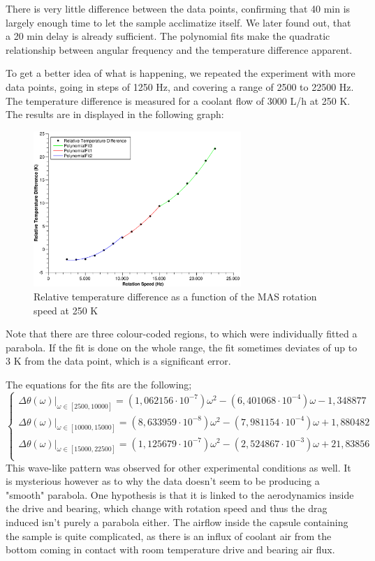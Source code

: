 \documentclass[12pt]{article}
\begin{document}
There is very little difference between the data points, confirming that 40 min is largely enough time to let the sample acclimatize itself. We later found out, that a 20 min delay is already sufficient. The polynomial fits make the quadratic relationship between angular frequency and the temperature difference apparent.

To get a better idea of what is happening, we repeated the experiment with more data points, going in steps of 1250 Hz, and covering a range of 2500 to 22500 Hz. The temperature difference is measured for a coolant flow of 3000 L/h at 250 K. The results are in displayed in the following graph:

\begin{figure}[!ht]
    \centering
    \includegraphics[width=0.7\textwidth]{207Pb/207Pb_250K.pdf}
    \caption{Relative temperature difference as a function of the MAS rotation speed at 250 K}
    \label{fig:207Pb_250K}
\end{figure}
\FloatBarrier

Note that there are three colour-coded regions, to which were individually fitted a parabola. If the fit is done on the whole range, the fit sometimes deviates of up to 3 K from the data point, which is a significant error.

The equations for the fits are the following;
\[
\begin{cases}
    \left. \Delta \theta (\omega) \right|_{\omega \in [2500,10000]} = (1,062156 \cdot 10^{-7}) \omega^2 -(6,401068 \cdot 10^{-4}) \omega - 1,348877 \\ 
    \left. \Delta \theta (\omega) \right|_{\omega \in [10000,15000]} = (8,633959 \cdot 10^{-8}) \omega^2 -(7,981154 \cdot 10^{-4}) \omega + 1,880482 \\ 
    \left. \Delta \theta (\omega) \right|_{\omega \in [15000,22500]} = (1,125679 \cdot 10^{-7}) \omega^2 -(2,524867 \cdot 10^{-3}) \omega + 21,83856 \\ 
\end{cases}
\]  
This wave-like pattern was observed for other experimental conditions as well. It is mysterious however as to why the data doesn't seem to be producing a "smooth" parabola. One hypothesis is that it is linked to the aerodynamics inside the drive and bearing, which change with rotation speed and thus the drag induced isn't purely a parabola either. The airflow inside the capsule containing the sample is quite complicated, as there is an influx of coolant air from the bottom coming in contact with room temperature drive and bearing air flux.
\end{document}
